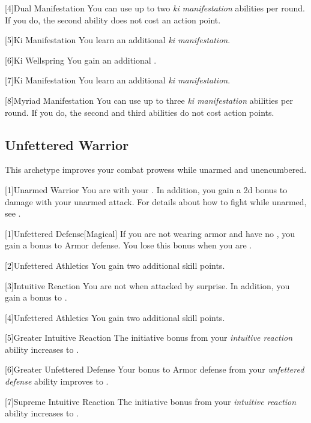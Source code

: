         [4]{Dual Manifestation} You can use up to two \textit{ki manifestation} abilities per round.
        If you do, the second ability does not cost an action point.

        [5]{Ki Manifestation}
        You learn an additional \textit{ki manifestation}.

        [6]{Ki Wellspring} You gain an additional .

        [7]{Ki Manifestation}
        You learn an additional \textit{ki manifestation}.

        [8]{Myriad Manifestation} You can use up to three \textit{ki manifestation} abilities per round.
        If you do, the second and third abilities do not cost action points.

    \subsection{Unfettered Warrior}
        This archetype improves your combat prowess while unarmed and unencumbered.

        [1]{Unarmed Warrior}
        You are  with your .
        In addition, you gain a \plus2d bonus to damage with your unarmed attack.
        For details about how to fight while unarmed, see .

        [1]{Unfettered Defense}[Magical]
        If you are not wearing armor and have no , you gain a  bonus to Armor defense.
        You lose this bonus when you are \helpless.

        [2]{Unfettered Athletics} You gain two additional skill points.

        [3]{Intuitive Reaction}
        You are not \unaware when attacked by surprise.
        In addition, you gain a  bonus to .

        [4]{Unfettered Athletics} You gain two additional skill points.

        [5]{Greater Intuitive Reaction}
        The initiative bonus from your \textit{intuitive reaction} ability increases to .

        [6]{Greater Unfettered Defense}
        Your bonus to Armor defense from your \textit{unfettered defense} ability improves to .

        [7]{Supreme Intuitive Reaction}
        The initiative bonus from your \textit{intuitive reaction} ability increases to .

